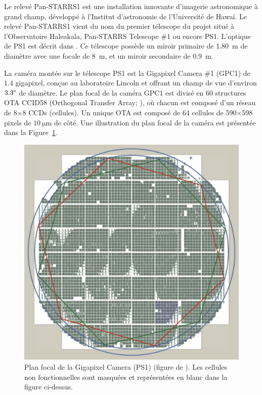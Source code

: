 \documentclass[../main/main.tex]{subfiles}
\begin{document}
Le relevé Pan-STARRS1 \citep{ChambersPS1survey} est une installation innovante d’imagerie
astronomique à grand champ,
développé à l'Institut d'astronomie de l'Université de Hawaï. Le relevé
Pan-STARRS1 vient du nom du premier télescope du projet situé à l'Observatoire Haleakala,
Pan-STARRS Telescope \#1 ou encore PS1. L'optique de PS1 est décrit dans
\citet{Hodapp2004a, Hodapp2004b, Hodapp2004c, Morgan2008}.
Ce télescope possède un miroir
primaire de \SI{1.80}{\meter} de diamètre avec une focale de \SI{8}{\meter}, et un miroir
secondaire de \SI{0.9}{\meter}. 

La caméra montée sur le télescope PS1 est la Gigapixel Camera \#1
(GPC1) de $1.4$ gigapixel, conçue au laboratoire Lincoln
\citep{Tonry2006GPC1,Tonry2008GPC1} et offrant un champ de vue d'environ
$3.3\degree$ de diamètre. 
Le plan focal de la caméra GPC1 est divisé en 60 structures OTA CCID58
(Orthogonal Transfer Array; \citet{Tonry1997OTA,Tonry2008GPC1}), où
chacun est composé d'un réseau de 8$\times$8 CCDs (cellules). Un unique
OTA est composé de 64 cellules de 590$\times$598 pixels de
$\SI{10}{\micro\metre}$ de côté. Une illustration du plan focal de la
caméra est présentée dans la Figure~\ref{fig:gpc1focalplan}.

\begin{figure}[h]
  \begin{minipage}[c]{0.4\textwidth}
    \includegraphics[width=\textwidth]{../figures/05_sedfit/GPC1focalplan.png}
  \end{minipage}\hfill
  \begin{minipage}[c]{0.5\textwidth}
    \caption[Plan focal de la Gigapixel Camera (PS1)]{Plan focal de la
    Gigapixel Camera (PS1) (figure de \citet{ChambersPS1survey}). Les cellules non fonctionnelles sont
    masquées et représentées en blanc dans la figure ci-dessus.}\label{fig:gpc1focalplan}
  \end{minipage}
\end{figure}
\end{document}
